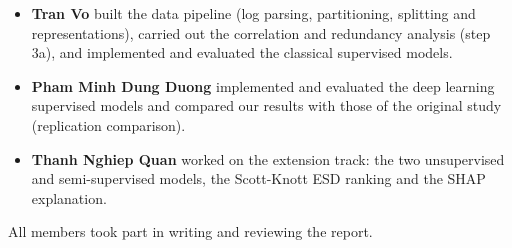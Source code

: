 \documentclass[10pt, conference]{IEEEtran}
\begin{document}
\begin{itemize}
\item \textbf{Tran Vo} built the data pipeline (log parsing, partitioning, splitting and representations), carried out the correlation and redundancy analysis (step 3a), and implemented and evaluated the classical supervised models.
\item \textbf{Pham Minh Dung Duong} implemented and evaluated the deep learning supervised models and compared our results with those of the original study (replication comparison).
\item \textbf{Thanh Nghiep Quan} worked on the extension track: the two unsupervised and semi-supervised models, the Scott-Knott ESD ranking and the SHAP explanation.
\end{itemize}

All members took part in writing and reviewing the report.

\balance


\end{document}

